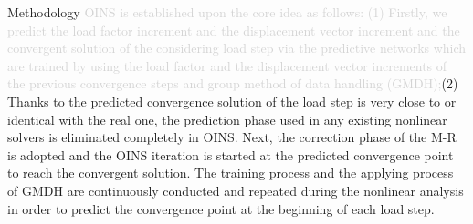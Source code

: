 \documentclass[
10pt,
aspectratio=169,
]{beamer}
\begin{document}
\begin{frame}{Methodology}
    \textcolor{lightgray}{OINS is established upon the core idea as follows: (1) Firstly, we predict the load factor increment and the displacement vector increment and the convergent solution of the considering load step via the predictive networks which are trained by using the load factor and the displacement vector increments of the previous convergence steps and group method of data handling (GMDH);}(2) Thanks to the predicted convergence solution of the load step is very close to or identical with the real one, the prediction phase used in any existing nonlinear solvers is eliminated completely in OINS. Next, the correction phase of the M-R is adopted and the OINS iteration is started at the predicted convergence point to reach the convergent solution. The training process and the applying process of GMDH are continuously conducted and repeated during the nonlinear analysis in order to predict the convergence point at the beginning of each load step.
\end{frame}
\end{document}
